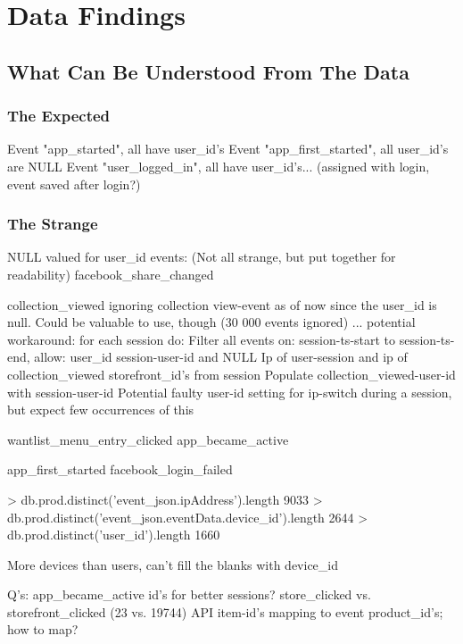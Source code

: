 \section{Data Findings}
\subsection{What Can Be Understood From The Data}



\subsubsection{The Expected}
Event "app\_started", all have user\_id's
Event "app\_first\_started", all user\_id's are NULL
Event "user\_logged\_in", all have user\_id's... (assigned with login, event saved after login?)

\subsubsection{The Strange}
NULL valued  for user\_id events: (Not all strange, but put together for readability)
facebook\_share\_changed

collection\_viewed  ignoring collection view-event as of now since the user\_id is null. Could be valuable to use, though (30 000 events ignored) ...
potential workaround:
    for each session do:
        Filter all events on:
            session-ts-start to session-ts-end,
            allow: user\_id session-user-id and NULL
            Ip of user-session and ip of collection\_viewed
            storefront\_id's from session
                Populate collection\_viewed-user-id with session-user-id
Potential faulty user-id setting for ip-switch during a session, but expect few occurrences of this

wantlist\_menu\_entry\_clicked
app\_became\_active

app\_first\_started
facebook\_login\_failed

> db.prod.distinct('event\_json.ipAddress').length
9033
> db.prod.distinct('event\_json.eventData.device\_id').length
2644
> db.prod.distinct('user\_id').length
1660

More devices than users, can't fill the blanks with device\_id

Q's:
    app\_became\_active id's for better sessions?
    store\_clicked vs. storefront\_clicked (23 vs. 19744)
    API item-id's mapping to event product\_id's; how to map?



